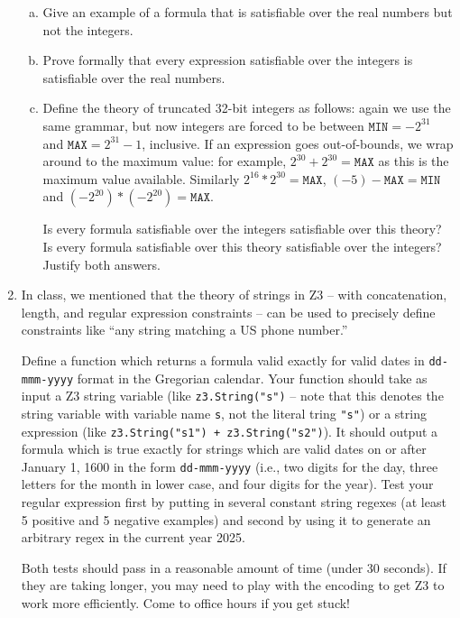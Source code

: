 \documentclass{article}
\begin{document}
\begin{enumerate}
\begin{enumerate}[(a)]
\item Give an example of a formula that is satisfiable over the real numbers but not the integers.
\item Prove formally that every expression satisfiable over the integers is satisfiable over the real numbers.
\item Define the theory of truncated 32-bit integers as follows: again we use the same grammar, but now integers are forced to be between $\texttt{MIN} = -2^{31}$ and $\texttt{MAX} = 2^{31} - 1$, inclusive. If an expression goes out-of-bounds, we wrap around to the maximum value: for example, $2^{30} + 2^{30} = \texttt{MAX}$ as this is the maximum value available. Similarly $2^{16} * 2^{30} = \texttt{MAX}$, $(-5) - \texttt{MAX} = \texttt{MIN}$ and $(-2^{20}) * (-2^{20}) = \texttt{MAX}$.

Is every formula satisfiable over the integers satisfiable over this theory?
Is every formula satisfiable over this theory satisfiable over the integers?
Justify both answers.
\end{enumerate}

\item
In class, we mentioned that the theory of strings in Z3 -- with concatenation, length, and regular expression constraints --
can be used to precisely define constraints like ``any string matching a US phone number.''

Define a function which returns a formula valid exactly for valid dates in \texttt{dd-mmm-yyyy} format
in the Gregorian calendar.
Your function should take as input a Z3 string variable (like \texttt{z3.String("s")} -- note that this denotes
the string variable with variable name \texttt{s}, not the literal tring \texttt{"s"})
or a string expression (like \texttt{z3.String("s1") + z3.String("s2")}).
It should output a formula which is true exactly for strings which are valid dates
on or after January 1, 1600 in the form \texttt{dd-mmm-yyyy}
(i.e., two digits for the day, three letters for the month in lower case, and four digits for the year).
Test your regular expression first by putting in several constant string regexes (at least 5 positive and 5 negative examples)
and second by using it to generate an arbitrary regex in the current year 2025.

Both tests should pass in a reasonable amount of time (under 30 seconds).
If they are taking longer, you may need to play with the encoding
to get Z3 to work more efficiently. Come to office hours if you get stuck!


\end{enumerate}
\end{document}
